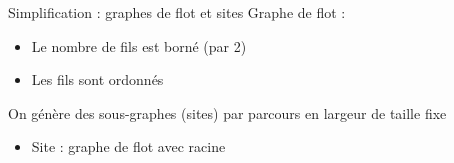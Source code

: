 \documentclass{beamer}
\begin{document}
\begin{frame}{Simplification : graphes de flot et sites}
Graphe de flot :
\begin{itemize}
 \item Le nombre de fils est borné (par 2)
 \item Les fils sont ordonnés
\end{itemize}
On génère des sous-graphes (sites) par parcours en largeur de taille fixe
\begin{itemize}
 \item Site : graphe de flot avec racine
\end{itemize}


% 


\end{frame}
\end{document}
